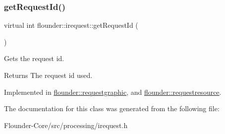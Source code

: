 \subsubsection{\texorpdfstring{get\+Request\+Id()}{getRequestId()}}
{\footnotesize\ttfamily virtual int flounder\+::irequest\+::get\+Request\+Id (\begin{DoxyParamCaption}{ }\end{DoxyParamCaption})\hspace{0.3cm}{\ttfamily [pure virtual]}}



Gets the request id. 

\begin{DoxyReturn}{Returns}
The request id used. 
\end{DoxyReturn}


Implemented in \hyperlink{classflounder_1_1requestgraphic_adc8967c8b3db4d7e932cdeee346a31ff}{flounder\+::requestgraphic}, and \hyperlink{classflounder_1_1requestresource_a4c46533325ddc35a1b89e4af418ea77e}{flounder\+::requestresource}.



The documentation for this class was generated from the following file\+:\begin{DoxyCompactItemize}
\item 
Flounder-\/\+Core/src/processing/irequest.\+h\end{DoxyCompactItemize}
